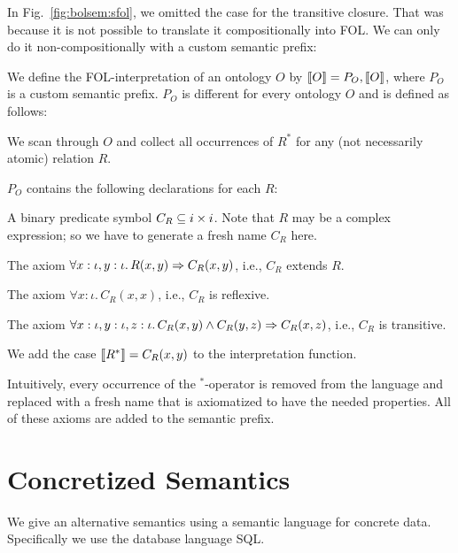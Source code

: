 \begin{example}\label{ex:noncompositional}
In Fig.~\ref{fig:bolsem:sfol}, we omitted the case for the transitive closure.
That was because it is not possible to translate it compositionally into FOL.
We can only do it non-compositionally with a custom semantic prefix:

We define the FOL-interpretation of an ontology $O$ by $\llbracket O\rrbracket=P_O,\llbracket O\rrbracket$, where $P_O$ is a custom semantic prefix.
$P_O$ is different for every ontology $O$ and is defined as follows:

\begin{compactenum}
 \item We scan through $O$ and collect all occurrences of $R^*$ for any (not necessarily atomic) relation $R$.
 \item $P_O$ contains the following declarations for each $R$:
  \begin{compactitem}
  \item A binary predicate symbol $C_R\subseteq i\times i$. Note that $R$ may be a complex expression; so we have to generate a fresh name $C_R$ here.
  \item The axiom $\forall x:\iota,y:\iota.\,R(x,y)\Rightarrow C_R(x,y)$, i.e., $C_R$ extends $R$.
  \item The axiom $\forall x:\iota.\,C_R(x,x)$, i.e., $C_R$ is reflexive.
  \item The axiom $\forall x:\iota,y:\iota,z:\iota.\,C_R(x,y)\wedge C_R(y,z)\Rightarrow C_R(x,z)$, i.e., $C_R$ is transitive.
  \end{compactitem}
 \item We add the case $\llbracket R^*\rrbracket=C_R(x,y)$ to the interpretation function.
\end{compactenum}

Intuitively, every occurrence of the $^*$-operator is removed from the language and replaced with a fresh name that is axiomatized to have the needed properties.
All of these axioms are added to the semantic prefix.
\end{example}

\section{Concretized Semantics}\label{sec:bolsem:conc}

We give an alternative semantics using a semantic language for concrete data.
Specifically we use the database language SQL.

